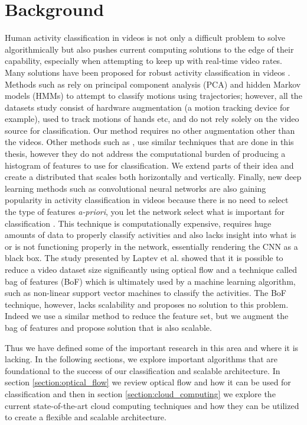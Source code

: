 \chapter{Background}
Human activity classification in videos is not only a difficult problem to solve
algorithmically but also pushes current computing solutions to the edge of their
capability, especially when attempting to keep up with real-time video rates.
Many solutions have been proposed for robust activity classification in videos
\cite{niebles2010modeling} \cite{bashir2007object} \cite{ribeiro2005human}
\cite{karpathy2014large}. Methods such as \cite{bashir2007object} rely on
principal component analysis (PCA) and hidden Markov models (HMMs) to attempt to
classify motions using trajectories; however, all the datasets study consist of
hardware augmentation (a motion tracking device for example), used to track
motions of hands etc, and do not rely solely on the video source for
classification. Our method requires no other augmentation  other than the
videos.  Other methods such as \cite{niebles2010modeling}, use similar
techniques that are done in this thesis, however they do not address the
computational burden of producing a histogram of features to use for
classification. We extend parts of their idea and create a  distributed that
scales both horizontally and vertically. Finally, new deep learning methods such
as convolutional neural networks are also gaining popularity in activity
classification in videos because there is no need to select the type of features
\textit{a-priori}, you let the network select what is important for
classification \cite{karpathy2014large}. This technique is computationally
expensive, requires huge amounts of data to properly classify activities
\cite{karpathy2014large} and also lacks insight into what is or is not
functioning properly  in the network, essentially rendering the CNN as a black
box. The study presented by Laptev et al. \cite{laptev2008learning} showed that
it is possible to reduce a video dataset size significantly using optical flow
and a technique called bag of features (BoF) which is ultimately used by a
machine learning algorithm, such as non-linear support vector machines to
classify the activities. The BoF technique, however, lacks scalability and
proposes no solution to this problem. Indeed we use a similar method to
reduce the feature set, but we augment the bag of features and propose
solution that is also scalable.

Thus we have defined some of the important research in this area and where it is
lacking. In the following sections, we explore important algorithms that are
foundational to the success of our classification and scalable architecture. In
section \ref{section:optical_flow} we review optical flow and how it can be used
for classification and then in section \ref{section:cloud_computing} we explore
the current state-of-the-art cloud computing techniques and how they can be
utilized to create a flexible and scalable architecture.

